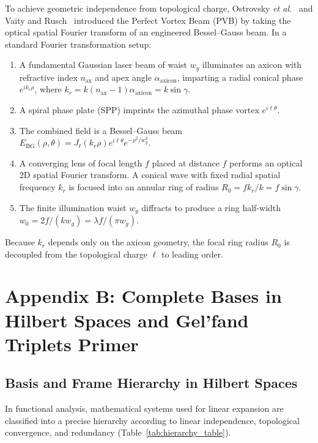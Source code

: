 \documentclass{optica-article}
\begin{document}
To achieve geometric independence from topological charge, Ostrovsky \emph{et al.}~\cite{Ostrovsky2013} and Vaity and Rusch~\cite{Vaity2015} introduced the Perfect Vortex Beam (PVB) by taking the optical spatial Fourier transform of an engineered Bessel--Gauss beam. In a standard Fourier transformation setup:
\begin{enumerate}
    \item A fundamental Gaussian laser beam of waist $w_g$ illuminates an axicon with refractive index $n_{\text{ax}}$ and apex angle $\alpha_{\text{axicon}}$, imparting a radial conical phase $e^{i k_r \rho}$, where $k_r = k (n_{\text{ax}}-1) \alpha_{\text{axicon}} = k \sin \gamma$.
    \item A spiral phase plate (SPP) imprints the azimuthal phase vortex $e^{i \ell \theta}$.
    \item The combined field is a Bessel--Gauss beam $E_{\text{BG}}(\rho, \theta) = J_\ell(k_r \rho) e^{i \ell \theta} e^{-\rho^2 / w_g^2}$.
    \item A converging lens of focal length $f$ placed at distance $f$ performs an optical 2D spatial Fourier transform. A conical wave with fixed radial spatial frequency $k_r$ is focused into an annular ring of radius $R_0 = f k_r / k = f \sin \gamma$.
    \item The finite illumination waist $w_g$ diffracts to produce a ring half-width $w_0 = 2f / (k w_g) = \lambda f / (\pi w_g)$.
\end{enumerate}
Because $k_r$ depends only on the axicon geometry, the focal ring radius $R_0$ is decoupled from the topological charge $\ell$ to leading order.

\section{Appendix B: Complete Bases in Hilbert Spaces and Gel'fand Triplets Primer}
\label{app:hilbert}

\subsection{Basis and Frame Hierarchy in Hilbert Spaces}

In functional analysis, mathematical systems used for linear expansion are classified into a precise hierarchy according to linear independence, topological convergence, and redundancy (Table~\ref{tab:hierarchy_table}).
\end{document}
